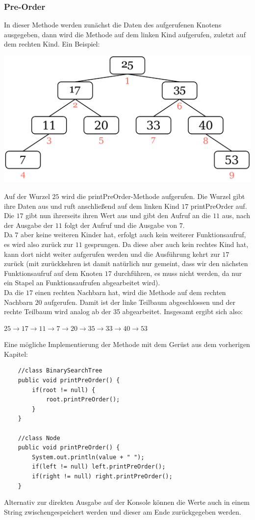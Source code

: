 \documentclass{article}
\begin{document}
\subsubsection{Pre-Order}
In dieser Methode werden zunächst die Daten des aufgerufenen Knotens ausgegeben, dann wird die Methode auf dem linken Kind aufgerufen, zuletzt auf dem rechten Kind. Ein Beispiel:
\begin{center}
    \includegraphics[scale=0.2]{../../media/preorder.png}
\end{center}
Auf der Wurzel $25$ wird die printPreOrder-Methode aufgerufen. Die Wurzel gibt ihre Daten aus und ruft anschließend auf dem linken Kind $17$ printPreOrder auf. Die $17$ gibt nun ihrerseits ihren Wert aus und gibt den Aufruf an die $11$ aus, nach der Ausgabe der $11$ folgt der Aufruf und die Ausgabe von $7$. \\
Da $7$ aber keine weiteren Kinder hat, erfolgt auch kein weiterer Funktionsaufruf, es wird also zurück zur $11$ gesprungen. Da diese aber auch kein rechtes Kind hat, kann dort nicht weiter aufgerufen werden und die Ausführung kehrt zur $17$ zurück (mit zurückkehren ist damit natürlich nur gemeint, dass wir den nächsten Funktionsaufruf auf dem Knoten $17$ durchführen, es muss nicht  werden, da nur ein Stapel an Funktionsaufrufen abgearbeitet wird). \\
Da die $17$ einen rechten Nachbarn hat, wird die Methode auf dem rechten Nachbarn $20$ aufgerufen. Damit ist der linke Teilbaum abgeschlossen und der rechte Teilbaum wird analog ab der 35 abgearbeitet. Insgesamt ergibt sich also:
\begin{center}
    $25 \rightarrow 17 \rightarrow 11 \rightarrow 7 \rightarrow 20 \rightarrow 35 \rightarrow 33 \rightarrow 40 \rightarrow 53$
\end{center}
Eine mögliche Implementierung der Methode mit dem Gerüst aus dem vorherigen Kapitel: 
\begin{verbatim}
    //class BinarySearchTree
    public void printPreOrder() {
        if(root != null) {
            root.printPreOrder();
        }
    }

    //class Node 
    public void printPreOrder() {
        System.out.println(value + " ");
        if(left != null) left.printPreOrder();
        if(right != null) right.printPreOrder();
    }
\end{verbatim}
Alternativ zur direkten Ausgabe auf der Konsole können die Werte auch in einem String zwischengespeichert werden und dieser am Ende zurückgegeben werden. 
\end{document}
